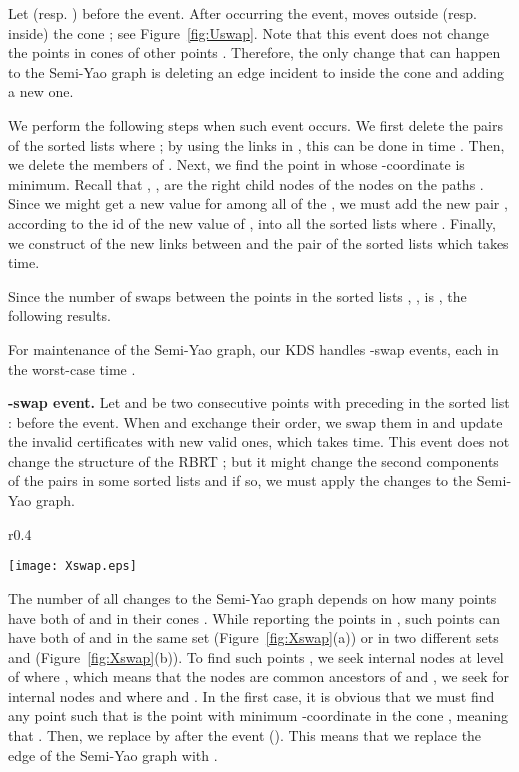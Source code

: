 \documentclass[11pt]{llncs}
\begin{document}
Let  (resp. ) before the event. After occurring the event,  moves outside (resp. inside) the cone ; see Figure~\ref{fig:Uswap}. Note that this event does not change the points in cones  of other points . Therefore, the only change that can happen to the Semi-Yao graph is deleting an edge incident to  inside the cone  and adding a new one. 

We perform the following steps when such event occurs. We first delete the pairs  of the sorted lists  where ; by using the links in , this can be done in time . Then, we delete the members of . Next, we find the point  in  whose -coordinate is minimum. Recall that , , are the right child nodes of the nodes on the paths . Since we might get a new value for  among all of the , we must add the new pair , according to the id of the new value of , into all the sorted lists  where . Finally, we construct  of the new links between  and the pair  of the sorted lists  which takes  time.


Since the number of swaps between the points in the sorted lists , , is , the following results.
\begin{lemma}\label{the:Uswap}
For maintenance of the Semi-Yao graph, our KDS handles  -swap events, each in the worst-case time .
\end{lemma}
\textbf{-swap event.} Let  and  be two consecutive points with  preceding  in the sorted list :  before the event. When  and  exchange their order, we swap them in  and update the invalid certificates with new valid ones, which takes  time. This event does not change the structure of the RBRT ; but it might change the second components of the pairs in some sorted lists  and if so, we must apply the changes to the Semi-Yao graph. 

\begin{wrapfigure}{r}{0.4\textwidth}
\vspace{-20pt}
  \begin{center}
    \texttt{[image: Xswap.eps]}
  \end{center}
  \vspace{-10pt}
  \caption{\small Two cases when an -swap between  and  occurs.}
  \vspace{-20pt}
  \label{fig:Xswap}
\end{wrapfigure}
The number of all changes to the Semi-Yao graph depends on how many points  have both of  and  in their cones . While reporting the points in , such points  can have both of  and  in the same set  (Figure~\ref{fig:Xswap}(a)) or in two different sets  and  (Figure~\ref{fig:Xswap}(b)). To find such points ,  we seek internal nodes  at level  of  where , which means that the nodes  are common ancestors of  and ,  we seek for internal nodes  and  where  and . In the first case, it is obvious that we must find any point  such that  is the point with minimum -coordinate in the cone , meaning that . Then, we replace  by  after the event (). This means that we replace the edge  of the Semi-Yao graph with . 
\end{document}
